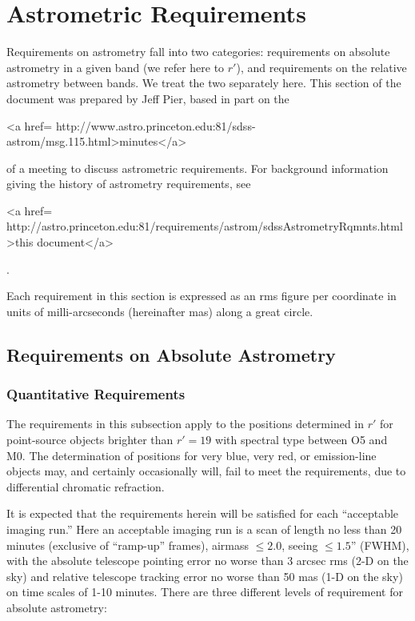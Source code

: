 \section{Astrometric Requirements}
\label{sec:astrom}

Requirements on astrometry fall into two categories: requirements on
absolute astrometry in a given band (we refer here to $r'$), and
requirements on the relative astrometry between bands.  We treat the
two separately here.  This section of the document was prepared by
Jeff Pier, 
based in part on the 
\begin{rawhtml}
<a href=
http://www.astro.princeton.edu:81/sdss-astrom/msg.115.html>minutes</a>\end{rawhtml} of a meeting to discuss astrometric
requirements.   For
background information giving the history of astrometry requirements,
see 
\begin{rawhtml}
<a href=
http://astro.princeton.edu:81/requirements/astrom/sdssAstrometryRqmnts.html>this document</a>\end{rawhtml}.  

Each requirement in this section is expressed as an rms figure per
coordinate in units of milli-arcseconds (hereinafter mas) along a great
circle. 

\subsection{Requirements on Absolute Astrometry}
\subsubsection {Quantitative Requirements}
 The requirements in this subsection apply to the positions determined
in $r'$ for point-source objects brighter than $r' = 19$ with spectral
type between O5 and M0. The determination of
positions for very blue, very red, or emission-line objects may, and
certainly occasionally will, fail to meet the requirements, due to
differential chromatic refraction.

It is expected that the requirements herein will be satisfied for each
``acceptable imaging run.'' Here an acceptable imaging run is a scan of
length no less than 20 minutes (exclusive of ``ramp-up'' frames),
airmass $\le 2.0$,
seeing $\le 1.5$'' (FWHM), with the absolute telescope pointing error
no worse than 3 arcsec rms (2-D on the sky) and relative telescope
tracking error no worse than 50 mas (1-D on the sky) on time scales
of 1-10 minutes.\hfill
\break 
\break
There are three different levels of requirement for absolute astrometry:

